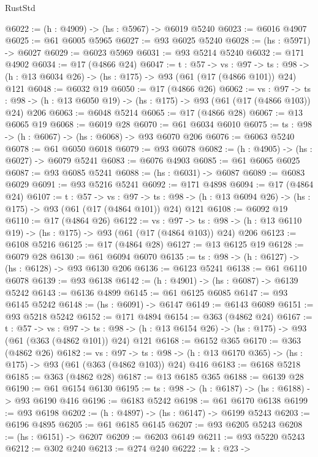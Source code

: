 \begin{lexlean}{RustStd}
\begin{coremodule}
@6022 := (h : @4909) -> (hs : @5967) -> @6019 @5240
@6023 := @6016 @4907
@6025 := @61 @6005 @5965
@6027 := @93 @6025 @5240
@6028 := (hs : @5971) -> @6027
@6029 := @6023 @5969
@6031 := @93 @5214 @5240
@6032 := @171 @4902
@6034 := @17 (@4866 @24)
@6047 := {t : @57} ->
  {vs : @97} ->
  {ts : @98} -> (h : @13 @6034 @26) -> (hs : @175) -> @93 (@61 (@17 (@4866 @101)) @24) @121
@6048 := @6032 @19
@6050 := @17 (@4866 @26)
@6062 := {vs : @97} ->
  {ts : @98} -> (h : @13 @6050 @19) -> (hs : @175) -> @93 (@61 (@17 (@4866 @103)) @24) @206
@6063 := @6048 @5214
@6065 := @17 (@4866 @28)
@6067 := @13 @6065 @19
@6068 := @6019 @28
@6070 := @61 @6034 @6010
@6075 := {ts : @98} -> (h : @6067) -> (hs : @6068) -> @93 @6070 @206
@6076 := @6063 @5240
@6078 := @61 @6050 @6018
@6079 := @93 @6078
@6082 := (h : @4905) -> (hs : @6027) -> @6079 @5241
@6083 := @6076 @4903
@6085 := @61 @6065 @6025
@6087 := @93 @6085 @5241
@6088 := (hs : @6031) -> @6087
@6089 := @6083 @6029
@6091 := @93 @5216 @5241
@6092 := @171 @4898
@6094 := @17 (@4864 @24)
@6107 := {t : @57} ->
  {vs : @97} ->
  {ts : @98} -> (h : @13 @6094 @26) -> (hs : @175) -> @93 (@61 (@17 (@4864 @101)) @24) @121
@6108 := @6092 @19
@6110 := @17 (@4864 @26)
@6122 := {vs : @97} ->
  {ts : @98} -> (h : @13 @6110 @19) -> (hs : @175) -> @93 (@61 (@17 (@4864 @103)) @24) @206
@6123 := @6108 @5216
@6125 := @17 (@4864 @28)
@6127 := @13 @6125 @19
@6128 := @6079 @28
@6130 := @61 @6094 @6070
@6135 := {ts : @98} -> (h : @6127) -> (hs : @6128) -> @93 @6130 @206
@6136 := @6123 @5241
@6138 := @61 @6110 @6078
@6139 := @93 @6138
@6142 := (h : @4901) -> (hs : @6087) -> @6139 @5242
@6143 := @6136 @4899
@6145 := @61 @6125 @6085
@6147 := @93 @6145 @5242
@6148 := (hs : @6091) -> @6147
@6149 := @6143 @6089
@6151 := @93 @5218 @5242
@6152 := @171 @4894
@6154 := @363 (@4862 @24)
@6167 := {t : @57} ->
  {vs : @97} ->
  {ts : @98} -> (h : @13 @6154 @26) -> (hs : @175) -> @93 (@61 (@363 (@4862 @101)) @24) @121
@6168 := @6152 @365
@6170 := @363 (@4862 @26)
@6182 := {vs : @97} ->
  {ts : @98} -> (h : @13 @6170 @365) -> (hs : @175) -> @93 (@61 (@363 (@4862 @103)) @24) @416
@6183 := @6168 @5218
@6185 := @363 (@4862 @28)
@6187 := @13 @6185 @365
@6188 := @6139 @28
@6190 := @61 @6154 @6130
@6195 := {ts : @98} -> (h : @6187) -> (hs : @6188) -> @93 @6190 @416
@6196 := @6183 @5242
@6198 := @61 @6170 @6138
@6199 := @93 @6198
@6202 := (h : @4897) -> (hs : @6147) -> @6199 @5243
@6203 := @6196 @4895
@6205 := @61 @6185 @6145
@6207 := @93 @6205 @5243
@6208 := (hs : @6151) -> @6207
@6209 := @6203 @6149
@6211 := @93 @5220 @5243
@6212 := @302 @240
@6213 := @274 @240
@6222 := {k : @23} ->

\end{coremodule}
\end{lexlean}
